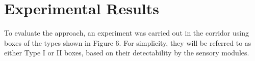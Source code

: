 \documentclass[conference]{IEEEtran}
\begin{document}











\section{Experimental Results}
To evaluate the approach, an experiment was carried out in the corridor using boxes of the types shown in Figure 6. For simplicity, they will be referred to as either Type I or II boxes, based on their detectability by the sensory modules.
\end{document}
